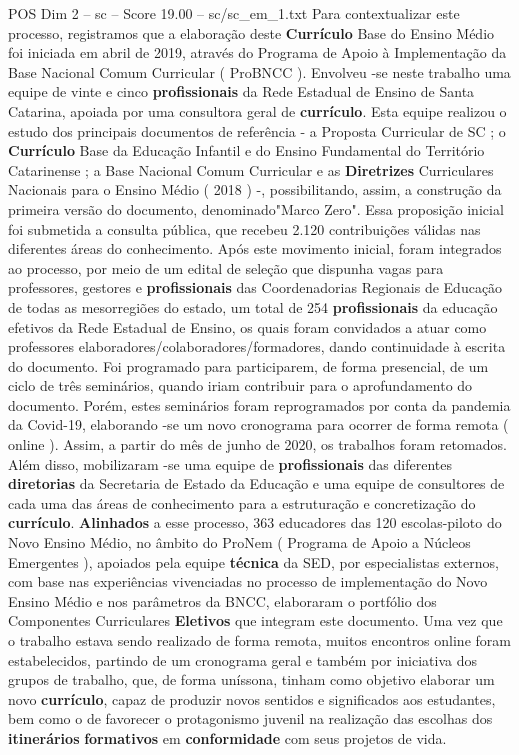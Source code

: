 \begin{textsample}{POS Dim 2 – sc – Score 19.00 – sc/sc\_em\_1.txt}
Para contextualizar este processo, registramos que a elaboração deste \textbf{Currículo} Base do Ensino Médio foi iniciada em abril de 2019, através do Programa de Apoio à Implementação da Base Nacional Comum Curricular ( ProBNCC ).
Envolveu -se neste trabalho uma equipe de vinte e cinco \textbf{profissionais} da Rede Estadual de Ensino de Santa Catarina, apoiada por uma consultora geral de \textbf{currículo}.
Esta equipe realizou o estudo dos principais documentos de referência - a Proposta Curricular de SC ; o \textbf{Currículo} Base da Educação Infantil e do Ensino Fundamental do Território Catarinense ; a Base Nacional Comum Curricular e as \textbf{Diretrizes} Curriculares Nacionais para o Ensino Médio ( 2018 ) -, possibilitando, assim, a construção da primeira versão do documento, denominado"Marco Zero".
Essa proposição inicial foi submetida a consulta pública, que recebeu 2.120 contribuições válidas nas diferentes áreas do conhecimento.
Após este movimento inicial, foram integrados ao processo, por meio de um edital de seleção que dispunha vagas para professores, gestores e \textbf{profissionais} das Coordenadorias Regionais de Educação de todas as mesorregiões do estado, um total de 254 \textbf{profissionais} da educação efetivos da Rede Estadual de Ensino, os quais foram convidados a atuar como professores elaboradores/colaboradores/formadores, dando continuidade à escrita do documento.
Foi programado para participarem, de forma presencial, de um ciclo de três seminários, quando iriam contribuir para o aprofundamento do documento.
Porém, estes seminários foram reprogramados por conta da pandemia da Covid-19, elaborando -se um novo cronograma para ocorrer de forma remota ( online ).
Assim, a partir do mês de junho de 2020, os trabalhos foram retomados.
Além disso, mobilizaram -se uma equipe de \textbf{profissionais} das diferentes \textbf{diretorias} da Secretaria de Estado da Educação e uma equipe de consultores de cada uma das áreas de conhecimento para a estruturação e concretização do \textbf{currículo}. \textbf{Alinhados} a esse processo, 363 educadores das 120 escolas-piloto do Novo Ensino Médio, no âmbito do ProNem ( Programa de Apoio a Núcleos Emergentes ), apoiados pela equipe \textbf{técnica} da SED, por especialistas externos, com base nas experiências vivenciadas no processo de implementação do Novo Ensino Médio e nos parâmetros da BNCC, elaboraram o portfólio dos Componentes Curriculares \textbf{Eletivos} que integram este documento.
Uma vez que o trabalho estava sendo realizado de forma remota, muitos encontros online foram estabelecidos, partindo de um cronograma geral e também por iniciativa dos grupos de trabalho, que, de forma uníssona, tinham como objetivo elaborar um novo \textbf{currículo}, capaz de produzir novos sentidos e significados aos estudantes, bem como o de favorecer o protagonismo juvenil na realização das escolhas dos \textbf{itinerários} \textbf{formativos} em \textbf{conformidade} com seus projetos de vida.

\end{textsample}
